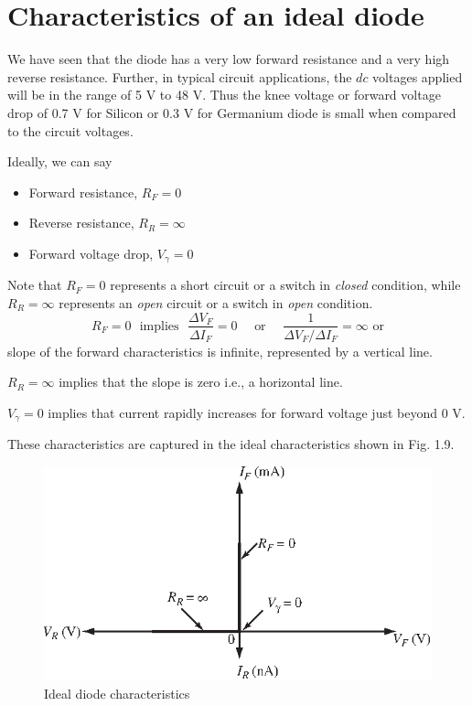 \section{Characteristics of an ideal diode}\label{sec1.12}

We have seen that the diode has a very low forward resistance and a
very high reverse resistance. Further, in typical circuit
applications, the $dc$ voltages applied will be in the range of 5 V to
48 V. Thus the knee voltage or forward voltage drop of 0.7 V for
Silicon or 0.3 V for Germanium diode is small when compared to the
circuit voltages.

Ideally, we can say
\begin{itemize}
\item Forward resistance, $R_F = 0$

\item Reverse resistance, $R_R = \infty$

\item Forward voltage drop, $V_\gamma = 0$
\end{itemize}

\vfill\eject

Note that $R_F = 0$ represents a short circuit or a switch in
\textit{closed} condition, while $R_R = \infty$ represents an
\textit{open} circuit or a switch in \textit{open} condition.
$$
R_F = 0 \text{~ implies ~} \frac{\Delta V_F}{\Delta I_F} = 0 \quad
\text{ or } \quad \frac{1}{\Delta V_F / \Delta I_F} = \infty \text{ or
}
$$
slope of the forward characteristics is infinite, represented by a
vertical line. 

$R_R  = \infty$ implies that the slope is zero i.e., a horizontal
line.

$V_\gamma =0$ implies that current rapidly increases for forward
voltage just beyond 0 V.

These characteristics are captured in the ideal characteristics shown
in Fig. 1.9.
\begin{figure}[H]
\centering
\includegraphics[scale=1.1]{chap1/S3-EE-01-016.eps}
\caption{Ideal diode characteristics}
\end{figure}

